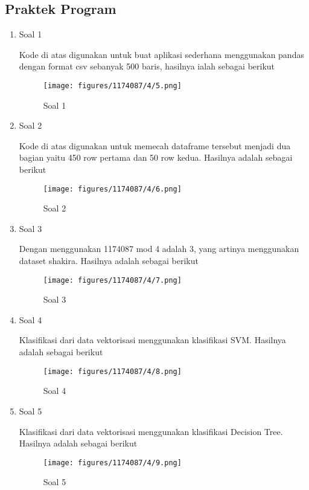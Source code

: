 \subsection{Praktek Program}
\begin{enumerate}
	\item Soal 1
	\hfill\break
	
	Kode di atas digunakan untuk buat aplikasi sederhana menggunakan pandas dengan format csv sebanyak 500 baris, hasilnya ialah sebagai berikut  
	\begin{figure}[H]
	\centering
		\texttt{[image: figures/1174087/4/5.png]}
		\caption{Soal 1}
	\end{figure}

	\item Soal 2
	\hfill\break
	
	Kode di atas digunakan untuk memecah dataframe tersebut menjadi dua bagian yaitu 450 row pertama dan 50 row kedua. Hasilnya adalah sebagai berikut 
	\begin{figure}[H]
	\centering
		\texttt{[image: figures/1174087/4/6.png]}
		\caption{Soal 2}
	\end{figure}

	\item Soal 3
	\hfill\break
	
	Dengan menggunakan 1174087 mod 4 adalah 3, yang artinya menggunakan dataset shakira. Hasilnya adalah sebagai berikut 
	\begin{figure}[H]
	\centering
		\texttt{[image: figures/1174087/4/7.png]}
		\caption{Soal 3}
	\end{figure}

	\item Soal 4
	\hfill\break
	
	Klasifikasi dari data vektorisasi menggunakan klasifikasi SVM. Hasilnya adalah sebagai berikut 
	\begin{figure}[H]
	\centering
		\texttt{[image: figures/1174087/4/8.png]}
		\caption{Soal 4}
	\end{figure}

	\item Soal 5
	\hfill\break
	
	Klasifikasi dari data vektorisasi menggunakan klasifikasi Decision Tree. Hasilnya adalah sebagai berikut 
	
	\begin{figure}[H]
	\centering
		\texttt{[image: figures/1174087/4/9.png]}
		\caption{Soal 5}
	\end{figure}


\end{enumerate}
